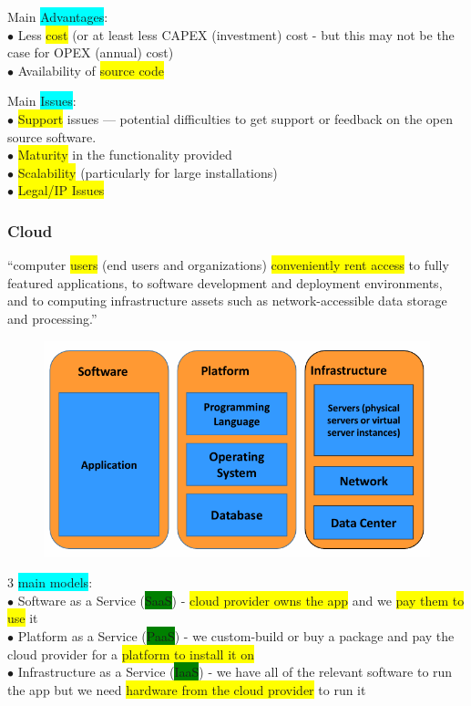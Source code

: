 \documentclass[]{project_plan}
\newcommand{\bulletPoint}{\hspace{-3.1pt}$\bullet$ \hspace{5pt}}
\begin{document}
Main \colorbox{cyan}{Advantages}:\\
\bulletPoint Less \colorbox{yellow}{cost} (or at least less CAPEX (investment) cost - but this may not be
the case for OPEX (annual) cost)\\
\bulletPoint Availability of \colorbox{yellow}{source code}

Main \colorbox{cyan}{Issues}:\\
\bulletPoint \colorbox{yellow}{Support} issues — potential difficulties to get support
or feedback on the open source software. \\
\bulletPoint \colorbox{yellow}{Maturity} in the functionality provided\\
\bulletPoint \colorbox{yellow}{Scalability} (particularly for large installations)\\
\bulletPoint \colorbox{yellow}{Legal/IP Issues}

\newpage

\subsubsection{Cloud}
“computer \colorbox{yellow}{users} (end users and organizations) \colorbox{yellow}{conveniently rent access} to fully featured
applications, to software development and deployment environments, and to computing infrastructure
assets such as network-accessible data storage and processing.”

\begin{figure}[h!]
  \centering
  \includegraphics[width=\linewidth]{cloud_models.png}
\end{figure}

3 \colorbox{cyan}{main models}:\\
\bulletPoint Software as a Service (\colorbox{green}{SaaS}) - \colorbox{yellow}{cloud provider owns the app} and we \colorbox{yellow}{pay them to use} it\\
\bulletPoint Platform as a Service (\colorbox{green}{PaaS}) - we custom-build or buy a package and pay the cloud provider for a \colorbox{yellow}{platform to install it on}\\
\bulletPoint Infrastructure as a Service (\colorbox{green}{IaaS}) - we have all of the relevant software to run the app but we need \colorbox{yellow}{hardware from the cloud provider} to run it
\end{document}
